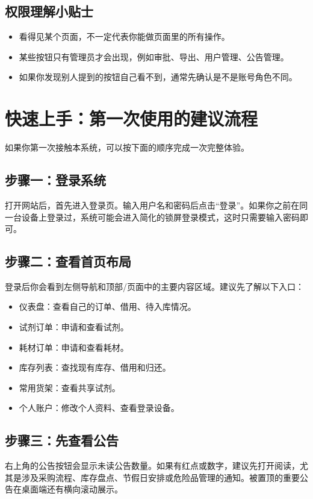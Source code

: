 \documentclass[12pt,a4paper]{ctexart}
\begin{document}
\subsection{权限理解小贴士}
\begin{itemize}
  \item 看得见某个页面，不一定代表你能做页面里的所有操作。
  \item 某些按钮只有管理员才会出现，例如审批、导出、用户管理、公告管理。
  \item 如果你发现别人提到的按钮自己看不到，通常先确认是不是账号角色不同。
\end{itemize}

\newpage
\section{快速上手：第一次使用的建议流程}

如果你第一次接触本系统，可以按下面的顺序完成一次完整体验。

\subsection{步骤一：登录系统}
打开网站后，首先进入登录页。输入用户名和密码后点击“登录”。如果你之前在同一台设备上登录过，系统可能会进入简化的锁屏登录模式，这时只需要输入密码即可。

\subsection{步骤二：查看首页布局}
登录后你会看到左侧导航和顶部/页面中的主要内容区域。建议先了解以下入口：
\begin{itemize}
  \item 仪表盘：查看自己的订单、借用、待入库情况。
  \item 试剂订单：申请和查看试剂。
  \item 耗材订单：申请和查看耗材。
  \item 库存列表：查找现有库存、借用和归还。
  \item 常用货架：查看共享试剂。
  \item 个人账户：修改个人资料、查看登录设备。
\end{itemize}

\subsection{步骤三：先查看公告}
右上角的公告按钮会显示未读公告数量。如果有红点或数字，建议先打开阅读，尤其是涉及采购流程、库存盘点、节假日安排或危险品管理的通知。被置顶的重要公告在桌面端还有横向滚动展示。
\end{document}
